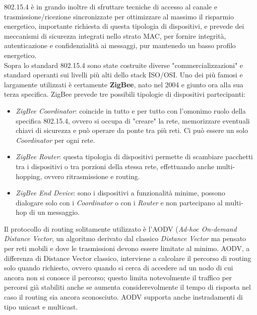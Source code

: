 802.15.4 è in grando inoltre di sfruttare tecniche di accesso al canale e trasmissione/ricezione sincronizzate per ottimizzare al massimo il risparmio energetico, importante richiesta di questa tipologia di dispositivi, e prevede dei meccanismi di sicurezza integrati nello strato MAC, per fornire integrità, autenticazione e confidenzialità ai messaggi, pur mantenedo un basso profilo energetico.
\vspace{1.0cm}
\\Sopra lo standard 802.15.4 sono state costruite diverse "commercializzazioni" e standard operanti sui livelli più alti dello stack ISO/OSI. Uno dei più famosi e largamente utilizzati è certamente \textbf{ZigBee}, nato nel 2004 e giunto ora alla sua terza specifica. ZigBee prevede tre possibili tipologie di dispositivi partecipanti:
\begin{itemize}
\item \textit{ZigBee Coordinator}: coincide in tutto e per tutto con l'omonimo ruolo della specifica 802.15.4, ovvero si occupa di "creare" la rete, memorizzare eventuali chiavi di sicurezza e può operare da ponte tra più reti. Ci può essere un solo \textit{Coordinator} per ogni rete.
\item \textit{ZigBee Router}: questa tipologia di dispositivi permette di scambiare pacchetti tra i dispositivi o tra porzioni della stessa rete, effettuando anche multi-hopping, ovvero ritrasmissione e routing.
\item \textit{ZigBee End Device}: sono i dispositivi a funzionalità minime, possono dialogare solo con i \textit{Coordinator} o con i \textit{Router} e non partecipano al multi-hop di un messaggio.
\end{itemize}
Il protocollo di routing solitamente utilizzato è l'AODV (\textit{Ad-hoc On-demand Distance Vector}, un algoritmo derivato dal classico \textit{Distance Vector} ma pensato per reti mobili e dove le trasmissioni devono essere limitate al minimo. AODV, a differenza di Distance Vector classico, interviene a calcolare il percorso di routing solo quando richiesto, ovvero quando si cerca di accedere ad un nodo di cui ancora non si conosce il percorso; questo limita notevolmente il traffico per percorsi già stabiliti anche se aumenta considerevolmente il tempo di risposta nel caso il routing sia ancora sconosciuto. AODV supporta anche instradamenti di tipo unicast e multicast.

